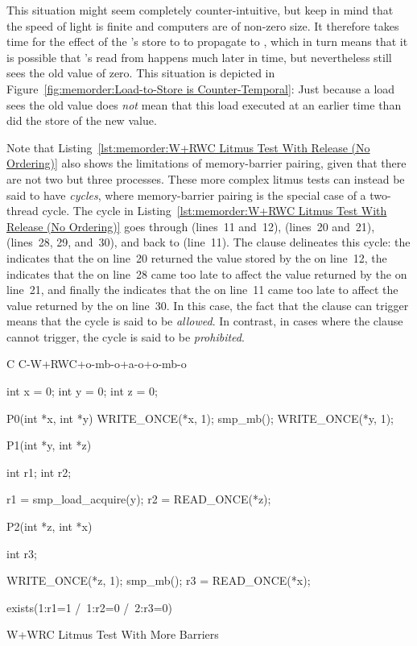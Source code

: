 This situation might seem completely counter-intuitive, but keep
in mind that the speed of light is finite and computers are of
non-zero size.
It therefore takes time for the effect of the 's store to
 to propagate to , which in turn means that it is possible
that 's read from  happens much later in time, but
nevertheless still sees the old value of zero.
This situation is depicted in
Figure~\ref{fig:memorder:Load-to-Store is Counter-Temporal}:
Just because a load sees the old value does \emph{not} mean that
this load executed at an earlier time than did the store of the
new value.

Note that
Listing~\ref{lst:memorder:W+RWC Litmus Test With Release (No Ordering)}
also shows the limitations of memory-barrier pairing, given that
there are not two but three processes.
These more complex litmus tests can instead be said to have \emph{cycles},
where memory-barrier pairing is the special case of a two-thread cycle.
The cycle in
Listing~\ref{lst:memorder:W+RWC Litmus Test With Release (No Ordering)}
goes through  (lines~11 and~12),  (lines~20 and~21),
 (lines~28, 29, and~30), and back to  (line~11).
The  clause delineates this cycle:
the  indicates that the  on line~20
returned the value stored by the  on line~12,
the  indicates that the  on line~28 came
too late to affect the value returned by the  on line~21,
and finally the  indicates that the
 on line~11 came too late to affect the value returned
by the  on line~30.
In this case, the fact that the  clause can trigger means that
the cycle is said to be \emph{allowed}.
In contrast, in cases where the  clause cannot trigger,
the cycle is said to be \emph{prohibited}.

\begin{listing}[tbp]
{ \scriptsize
\begin{verbbox}[\LstLineNo]
C C-W+RWC+o-mb-o+a-o+o-mb-o

{
int x = 0;
int y = 0;
int z = 0;
}

P0(int *x, int *y)
{
  WRITE_ONCE(*x, 1);
  smp_mb();
  WRITE_ONCE(*y, 1);
}

P1(int *y, int *z)
{
  int r1;
  int r2;

  r1 = smp_load_acquire(y);
  r2 = READ_ONCE(*z);
}

P2(int *z, int *x)
{
  int r3;

  WRITE_ONCE(*z, 1);
  smp_mb();
  r3 = READ_ONCE(*x);
}

exists(1:r1=1 /\ 1:r2=0 /\ 2:r3=0)
\end{verbbox}
}
\centering
\theverbbox
\caption{W+WRC Litmus Test With More Barriers}
\label{lst:memorder:W+WRC Litmus Test With More Barriers}
\end{listing}

